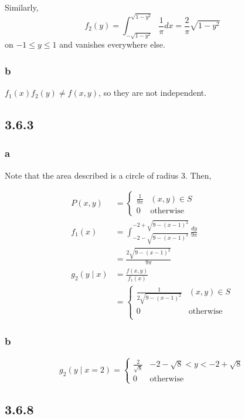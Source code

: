 \documentclass[12pt,letterpaper]{article}
\theoremstyle{definition}
\begin{document}
Similarly,
\[
  f_2(y) = \int_{-\sqrt{1-y^2}}^{\sqrt{1-y^2}}\frac{1}{\pi}dx = \frac{2}{\pi}\sqrt{1-y^2}
\]
on $-1 \leq y \leq 1$ and vanishes everywhere else.

\subsubsection*{b}

$f_1(x)f_2(y) \neq f(x, y)$, so they are not independent.

\subsection*{3.6.3}

\subsubsection*{a}

Note that the area described is a circle of radius 3. Then,

\begin{align*}
  P(x, y) &= \begin{cases}
    \frac{1}{9\pi} & (x, y) \in S \\
    0 & \text{otherwise}
  \end{cases} \\
  f_1(x) &= \int_{-2-\sqrt{9-(x-1)^2}}^{-2+\sqrt{9-(x-1)^2}} \frac{dy}{9\pi} \\
          &= \frac{2\sqrt{9-(x-1)^2}}{9\pi} \\
  g_2(y \mid x) &= \frac{f(x,y)}{f_1(x)} \\
          &= \begin{cases}
    \frac{1}{2\sqrt{9-(x-1)^2}} & (x, y) \in S \\
    0 & \text{otherwise} \\
  \end{cases}
\end{align*}

\subsubsection*{b}


\[
  g_2(y \mid x = 2) = \begin{cases}
    \frac{2}{\sqrt{8}} & -2 - \sqrt{8} < y < -2 + \sqrt{8} \\
    0 & \text{otherwise}
  \end{cases}
\]

\subsection*{3.6.8}
\end{document}

